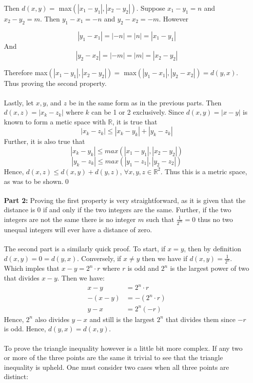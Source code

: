 \documentclass[12pt, letterpaper]{article}
\begin{document}
\noindent Then $d(x, y) = $ max$(|x_1 - y_1|, |x_2 - y_2|)$. Suppose $x_1 - y_1 = n$ and $x_2 - y_2 = m$. Then $y_1 - x_1 = -n$ and $y_2 - x_2 = -m$.
However

$$ |y_1 - x_1| = |-n| = |n| = |x_1 - y_1|$$
And
$$|y_2 - x_2| = |-m| = |m| = |x_2 - y_2| $$

\noindent Therefore max$(|x_1 - y_1|, |x_2 - y_2|) = $ max$(|y_1 - x_1|, |y_2 - x_2|) = d(y, x)$. Thus proving the second property.\\
\\
\noindent Lastly, let $x, y$, and $z$ be in the same form as in the previous parts. Then $d(x, z) = |x_k - z_k|$ where $k$ can be 1 or 2 exclusively.
Since $d(x, y) = |x - y|$ is known to form a metic space with $\mathbb{R}$, it is true that
$$ |x_k - z_k| \leq |x_k - y_k| + |y_k - z_k| $$
\noindent Further, it is also true that
$$|x_k - y_k| \leq max(|x_1 - y_1|, |x_2 - y_2|)$$
$$|y_k - z_k| \leq max(|y_1 - z_1|, |y_2 - z_2|)$$
Hence, $d(x, z) \leq d(x, y) + d(y, z)$, $\forall x, y, z \in \mathbb{R}^2$. Thus this is a metric space, as was to be shown.\qed\\
\\
\noindent\textbf{Part 2:}
Proving the first property is very straightforward, as it is given that the distance is 0 if and only if the two integers are the same.
Further, if the two integers are not the same there is no integer $m$ such that $\frac{1}{2^m} = 0$ thus no two unequal integers will ever have a distance of zero.\\
\\
The second part is a similarly quick proof. To start, if $x = y$, then by definition $d(x, y) = 0 = d(y, x)$. Conversely, if $x \neq y$ then we have if $d(x, y) = \frac{1}{2^n}$.
Which imples that $x - y = 2^n \cdot r$ where $r$ is odd and $2^n$ is the largest power of two that divides $x - y$. Then we have:
\begin{align*}
  x - y &= 2^n \cdot r\\
  -(x - y) &= -(2^n \cdot r)\\
  y - x &= 2^n(-r)
\end{align*}
Hence, $2^n$ also divides $y - x$ and still is the largest $2^n$ that divides them since $-r$ is odd. Hence, $d(y, x) = d(x, y)$.\\
\\
To prove the triangle inequality however is a little bit more complex. If any two or more of the three points are the same it trivial to see that the triangle inequality is upheld.
One must consider two cases when all three points are distinct:\\
\end{document}
